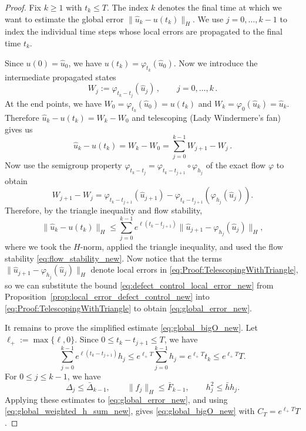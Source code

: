 \documentclass[oneside,11pt]{article}
\theoremstyle{remark}
\theoremstyle{thmstyleone}
\theoremstyle{thmstylethree}
\theoremstyle{thmstyletwo}
\newcommand{\norm}[1]{\lVert #1\rVert}
\newcommand{\tc}[1]{#1}
\begin{document}
\begin{proof}
  Fix $k\ge1$ with $t_k\le T$. The index $k$ denotes the final time at which we want to estimate the global error $\|\hat{u}_k - u(t_k)\|_H$. We use $j=0,\dots,k-1$ to index the individual time steps whose local errors are propagated to the final time $t_k$.

  Since $u(0) = \hat{u}_0$, we have $u(t_k) = \varphi_{t_k}(\hat{u}_0)$. Now we introduce the intermediate propagated states
  \[
    W_j := \varphi_{t_k - t_j}(\hat{u}_j)\,,\qquad j = 0, \dots, k\,.
  \]
  At the end points, we have $W_0 = \varphi_{t_k}(\hat{u}_0) = u(t_k)$ and $W_k = \varphi_0(\hat{u}_k) = \hat{u}_k$. Therefore $\hat{u}_k - u(t_k) = W_k - W_0$ and telescoping (Lady Windermere's fan) gives us
  \begin{equation}\label{eq:Proof:TelescopingglobalError}
    \hat{u}_k - u(t_k) = W_k - W_0 = \sum_{j = 0}^{k - 1}W_{j + 1} - W_j\,.
  \end{equation}
  Now use the semigroup property $\varphi_{t_k - t_j} = \varphi_{t_k - t_{j + 1}} \circ \varphi_{h_j}$ of the exact flow $\varphi$ to obtain
  \[
    W_{j+1}-W_j
    =
    \varphi_{t_k-t_{j+1}}(\hat u_{j+1})
    -
    \varphi_{t_k-t_{j+1}}(\varphi_{h_j}(\hat u_j)).
  \]
  Therefore, by the triangle inequality and flow stability,
  \begin{equation}\label{eq:Proof:TelescopingWithTriangle}
    \norm{\hat u_k-u(t_k)}_H
    \le
    \sum_{j=0}^{k-1}
    e^{\ell(t_k-t_{j+1})}
    \norm{\hat u_{j+1}-\varphi_{h_j}(\hat u_j)}_H,
  \end{equation}
  where we took the $H$-norm,  applied the triangle inequality, and used the flow stability  \eqref{eq:flow_stability_new}. Now notice that the terms $\|\hat{u}_{j + 1} - \varphi_{h_j}(\hat{u}_j)\|_H$ denote local errors in \eqref{eq:Proof:TelescopingWithTriangle}, so we can substitute the bound \eqref{eq:defect_control_local_error_new} from Proposition~\ref{prop:local_error_defect_control_new} into \eqref{eq:Proof:TelescopingWithTriangle} to obtain \eqref{eq:global_error_new}.


  It remains to prove the simplified estimate
  \eqref{eq:global_bigO_new}. Let $\ell_+:=\max\{\ell,0\}$.
  Since $0\le t_k-t_{j+1}\le T$, we have
  \begin{equation}
    \sum_{j=0}^{k-1}
    e^{\ell(t_k-t_{j+1})}\tc{h_j}
    \le
    e^{\ell_+T}
    \sum_{j=0}^{k-1}\tc{h_j}
    =
    e^{\ell_+T}t_k
    \le
    e^{\ell_+T}T.
    \label{eq:global_weighted_h_sum_new}
  \end{equation}
  For $0\le j\le k-1$, we have
  \[
    \Delta_j\le\bar\Delta_{k-1},
    \qquad
    \norm{f_j}_H\le\bar F_{k-1},
    \qquad
    \tc{h_j^2\le\bar h h_j}.
  \]
  Applying these estimates to
  \eqref{eq:global_error_new}, and using
  \eqref{eq:global_weighted_h_sum_new}, gives \eqref{eq:global_bigO_new}
  \tc{with $C_T=e^{\ell_+T}T$}.
\end{proof}
\end{document}
